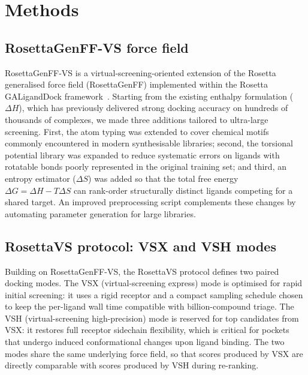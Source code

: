 \documentclass[11pt]{article}
\begin{document}
\section{Methods}

\subsection{RosettaGenFF-VS force field}
RosettaGenFF-VS is a virtual-screening-oriented extension of the Rosetta
generalised force field (RosettaGenFF) implemented within the Rosetta
GALigandDock framework~\citep{leman2020rosetta}. Starting from the existing
enthalpy formulation ($\Delta H$), which has previously delivered strong
docking accuracy on hundreds of thousands of complexes, we made three
additions tailored to ultra-large screening. First, the atom typing was
extended to cover chemical motifs commonly encountered in modern
synthesisable libraries; second, the torsional potential library was
expanded to reduce systematic errors on ligands with rotatable bonds
poorly represented in the original training set; and third, an entropy
estimator ($\Delta S$) was added so that the total free energy
$\Delta G = \Delta H - T\Delta S$ can rank-order structurally distinct
ligands competing for a shared target. An improved preprocessing script
complements these changes by automating parameter generation for large
libraries.

\subsection{RosettaVS protocol: VSX and VSH modes}
Building on RosettaGenFF-VS, the RosettaVS protocol defines two paired
docking modes. The VSX (virtual-screening express) mode is optimised for
rapid initial screening: it uses a rigid receptor and a compact sampling
schedule chosen to keep the per-ligand wall time compatible with
billion-compound triage. The VSH (virtual-screening high-precision) mode
is reserved for top candidates from VSX: it restores full receptor
sidechain flexibility, which is critical for pockets that undergo
induced conformational changes upon ligand binding. The two modes share
the same underlying force field, so that scores produced by VSX are
directly comparable with scores produced by VSH during re-ranking.
\end{document}
